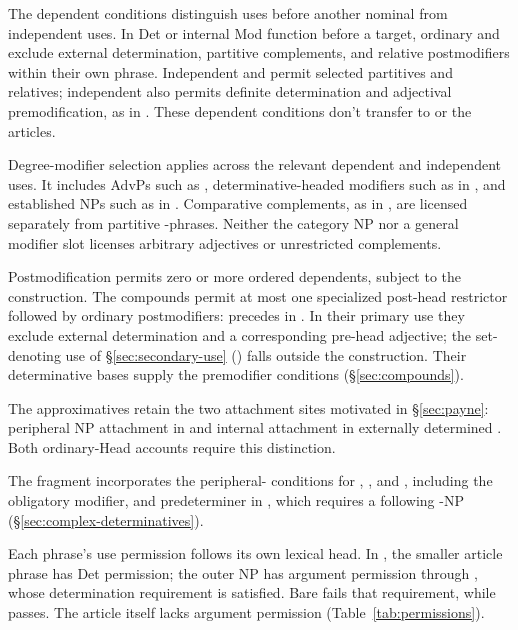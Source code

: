 \documentclass[12pt]{article}
\begin{document}
The dependent conditions distinguish uses before another nominal from independent uses. In Det or internal Mod function before a target, ordinary  and  exclude external determination, partitive complements, and relative postmodifiers within their own phrase. Independent  and  permit selected partitives and relatives; independent  also permits definite determination and adjectival premodification, as in . These dependent conditions don't transfer to  or the articles.

Degree-modifier selection applies across the relevant dependent and independent uses. It includes AdvPs such as , determinative-headed modifiers such as  in , and established NPs such as  in . Comparative complements, as in , are licensed separately from partitive -phrases. Neither the category NP nor a general modifier slot licenses arbitrary adjectives or unrestricted complements.

Postmodification permits zero or more ordered dependents, subject to the construction. The compounds permit at most one specialized post-head restrictor followed by ordinary postmodifiers:  precedes  in . In their primary use they exclude external determination and a corresponding pre-head adjective; the set-denoting use of §\ref{sec:secondary-use} () falls outside the construction. Their determinative bases supply the premodifier conditions (§\ref{sec:compounds}).

The approximatives retain the two attachment sites motivated in §\ref{sec:payne}: peripheral NP attachment in  and internal attachment in externally determined . Both ordinary-Head accounts require this distinction.

The fragment incorporates the peripheral- conditions for , , and , including the obligatory modifier, and predeterminer  in , which requires a following -NP (§\ref{sec:complex-determinatives}).

Each phrase's use permission follows its own lexical head. In , the smaller article phrase has Det permission; the outer NP has argument permission through , whose determination requirement is satisfied. Bare  fails that requirement, while  passes. The article itself lacks argument permission (Table~\ref{tab:permissions}).
\end{document}
